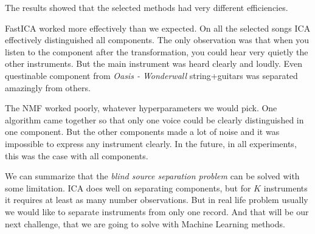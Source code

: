 \documentclass[../main.tex]{subfiles} %
\begin{document}
The results showed that the selected methods had very different efficiencies.

FastICA worked more effectively than we expected. On all the selected songs ICA effectively distinguished all components. The only observation was that when you listen to the component after the transformation, you could hear very quietly the other instruments. But the main instrument was heard clearly and loudly. Even questinable component from \textit{Oasis - Wonderwall} string+guitars was separated amazingly from others. 

The NMF worked poorly, whatever hyperparameters we would pick. One algorithm came together so that only one voice could be clearly distinguished in one component. But the other components made a lot of noise and it was impossible to express any instrument clearly. In the future, in all experiments, this was the case with all components.

We can summarize that the \textit{blind source separation problem} can be solved with some limitation. ICA does well on separating components, but for $K$ instruments it requires at least as many number observations. But in real life problem usually we would like to separate instruments from only one record. And that will be our next challenge, that we are going to solve with Machine Learning methods.
\end{document}
